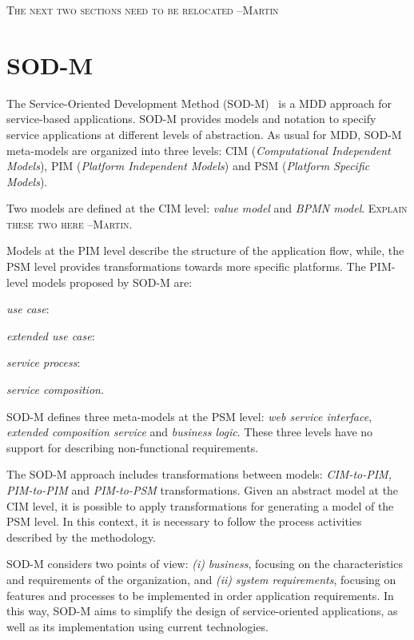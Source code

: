 

\bigskip
\textsc{The next two sections need to be relocated --Martin}
\bigskip

\section{SOD-M}\label{sec:sodm}
The Service-Oriented Development Method (SOD-M)~\cite{decastro1} is a MDD approach for service-based applications.
SOD-M provides models and notation to specify service applications at different levels of abstraction. 
As usual for MDD, SOD-M meta-models are organized into three levels: CIM (\textit{Computational Independent Models}), PIM (\textit{Platform Independent Models}) and PSM (\textit{Platform Specific Models}).

Two models are defined at the CIM level: \textit{value model} 
and \textit{BPMN model}. 
\textsc{Explain these two here --Martin.}

Models at the PIM level describe the structure of the application flow,
while, the PSM level provides transformations towards more specific platforms.
The PIM-level models proposed by SOD-M are: 
\begin{trivlist}
\item \textit{use case}: 
\item \textit{extended use case}:
\item \textit{service process}:
\item \textit{service composition}. 
\end{trivlist}

SOD-M defines three meta-models at the PSM level: \textit{web service interface}, \textit{extended composition service} and \textit{business logic}. 
These three levels have no support for describing non-functional requirements. 

The SOD-M approach includes transformations between models:
\textit{CIM-to-PIM, PIM-to-PIM} and \textit{PIM-to-PSM} transformations. Given
an abstract model at the CIM level, it is possible to apply transformations for
generating a model of the PSM level. In this context, it is necessary to
follow the process activities described by the methodology. 

SOD-M considers two points of view:
\textit{(i)} \textit{business}, focusing on the characteristics and requirements
of the organization, and \textit{(ii)} \textit{system requirements}, focusing on
features and processes to be implemented in order application requirements. In
this way, SOD-M aims to simplify the design of service-oriented applications, as
well as its implementation using current technologies.


